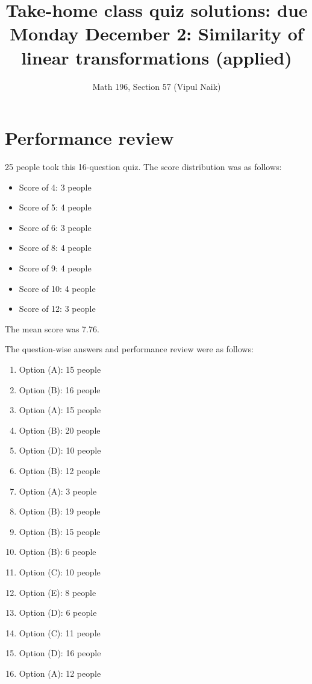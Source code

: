 \documentclass[10pt]{amsart}
\title{Take-home class quiz solutions: due Monday December 2: Similarity of linear transformations (applied)}
\author{Math 196, Section 57 (Vipul Naik)}
\begin{document}
\maketitle

\section{Performance review}

25 people took this 16-question quiz. The score distribution was as follows:

\begin{itemize}
\item Score of 4: 3 people
\item Score of 5: 4 people
\item Score of 6: 3 people
\item Score of 8: 4 people
\item Score of 9: 4 people
\item Score of 10: 4 people
\item Score of 12: 3 people
\end{itemize}

The mean score was 7.76.

The question-wise answers and performance review were as follows:

\begin{enumerate}
\item Option (A): 15 people
\item Option (B): 16 people
\item Option (A): 15 people
\item Option (B): 20 people
\item Option (D): 10 people
\item Option (B): 12 people%
\item Option (A): 3 people%
\item Option (B): 19 people%
\item Option (B): 15 people%
\item Option (B): 6 people%
\item Option (C): 10 people%
\item Option (E): 8 people%
\item Option (D): 6 people%
\item Option (C): 11 people%
\item Option (D): 16 people%
\item Option (A): 12 people%
\end{enumerate}
\end{document}
